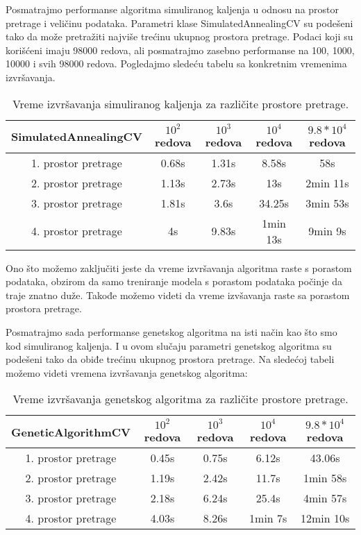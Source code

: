 \documentclass{article}
\begin{document}
\newpage
\noindent Posmatrajmo performanse algoritma simuliranog kaljenja u odnosu na prostor pretrage i veličinu podataka. Parametri klase SimulatedAnnealingCV su podešeni tako da može pretražiti najviše trećinu ukupnog prostora pretrage. Podaci koji su korišćeni imaju 98000 redova, ali posmatrajmo zasebno performanse na 100, 1000, 10000 i svih 98000 redova. Pogledajmo sledeću tabelu sa konkretnim vremenima izvršavanja.\newline
\vspace{0.25 cm}
\begin{table}[h]
\centering
\begin{tabular}{|c|c|c|c|c|}
\hline
 SimulatedAnnealingCV& $10^2$ redova & $10^3$ redova & $10^4$ redova & $9.8*10^4$ redova \\
\hline
1. prostor pretrage & 0.68s & 1.31s & 8.58s & 58s\\
\hline
2. prostor pretrage & 1.13s & 2.73s & 13s & 2min 11s\\
\hline
3. prostor pretrage & 1.81s & 3.6s & 34.25s & 3min 53s\\
\hline
4. prostor pretrage & 4s & 9.83s  & 1min 13s & 9min 9s\\
\hline
\end{tabular}
\caption{Vreme izvršavanja simuliranog kaljenja za različite prostore pretrage.}
\end{table}
\vspace{0.25 cm}

\noindent Ono što možemo zaključiti jeste da vreme izvršavanja algoritma raste s porastom podataka, obzirom da samo treniranje modela s porastom podataka počinje da traje znatno duže. Takođe možemo videti da vreme izvšavanja raste sa porastom prostora pretrage.\newline

\noindent Posmatrajmo sada performanse genetskog algoritma na isti način kao što smo kod simuliranog kaljenja. I u ovom slučaju parametri genetskog algoritma su podešeni tako da obiđe trećinu ukupnog prostora pretrage. Na sledećoj tabeli možemo videti vremena izvršavanja genetskog algoritma:\newline
\vspace{0.25 cm}
\begin{table}[h]
\centering
\begin{tabular}{|c|c|c|c|c|}
\hline
 GeneticAlgorithmCV& $10^2$ redova & $10^3$ redova & $10^4$ redova & $9.8*10^4$ redova \\
\hline
1. prostor pretrage & 0.45s & 0.75s & 6.12s & 43.06s\\
\hline
2. prostor pretrage & 1.19s & 2.42s & 11.7s & 1min 58s\\
\hline
3. prostor pretrage & 2.18s & 6.24s & 25.4s & 4min 57s\\
\hline
4. prostor pretrage & 4.03s & 8.26s  & 1min 7s & 12min 10s\\
\hline
\end{tabular}
\caption{Vreme izvršavanja genetskog algoritma za različite prostore pretrage.}
\end{table}
\vspace{0.25 cm}
\end{document}
